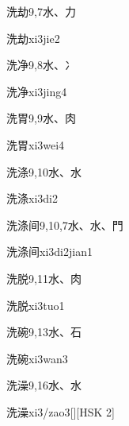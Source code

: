 \begin{Entry}{洗劫}{9,7}{⽔、⼒}
  \begin{Phonetics}{洗劫}{xi3jie2}
  \end{Phonetics}
\end{Entry}

\begin{Entry}{洗净}{9,8}{⽔、⼎}
  \begin{Phonetics}{洗净}{xi3jing4}
  \end{Phonetics}
\end{Entry}

\begin{Entry}{洗胃}{9,9}{⽔、⾁}
  \begin{Phonetics}{洗胃}{xi3wei4}
  \end{Phonetics}
\end{Entry}

\begin{Entry}{洗涤}{9,10}{⽔、⽔}
  \begin{Phonetics}{洗涤}{xi3di2}
  \end{Phonetics}
\end{Entry}

\begin{Entry}{洗涤间}{9,10,7}{⽔、⽔、⾨}
  \begin{Phonetics}{洗涤间}{xi3di2jian1}
  \end{Phonetics}
\end{Entry}

\begin{Entry}{洗脱}{9,11}{⽔、⾁}
  \begin{Phonetics}{洗脱}{xi3tuo1}
  \end{Phonetics}
\end{Entry}

\begin{Entry}{洗碗}{9,13}{⽔、⽯}
  \begin{Phonetics}{洗碗}{xi3wan3}
  \end{Phonetics}
\end{Entry}

\begin{Entry}{洗澡}{9,16}{⽔、⽔}
  \begin{Phonetics}{洗澡}{xi3/zao3}[][HSK 2]
  \end{Phonetics}
\end{Entry}

